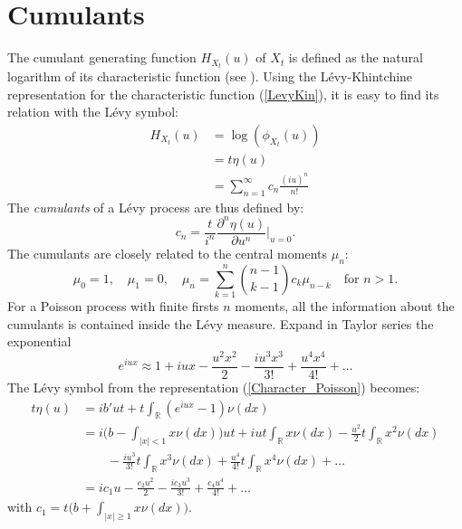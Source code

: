 \documentclass[]{interact}
\newcommand{\numberset}{\mathbb}
\newcommand{\R}{\numberset{R}}
\theoremstyle{plain}%
\theoremstyle{definition}
\theoremstyle{remark}
\begin{document}
\section{Cumulants}\label{App2}

The cumulant generating function $H_{X_t}(u)$ of $X_t$ is defined as the natural logarithm of its characteristic function
(see \cite{Cont}). 
Using the Lévy-Khintchine representation for the characteristic function (\ref{LevyKin}), it is easy to find its relation with
the Lévy symbol:
\begin{align}
H_{X_t}(u) &= \log(\phi_{X_t}(u)) \\ \nonumber
           &= t \eta(u) \\ \nonumber
           &= \sum_{n=1}^{\infty} c_n \frac{(iu)^n}{n!}
\end{align}
The \emph{cumulants} of a Lévy process are thus defined by:
\begin{equation}\label{cumulants}
 c_n = \frac{t}{i^n} \frac{\partial^n \eta(u) }{\partial u^{n}} \biggr|_{u=0} .
\end{equation}
The cumulants are closely related to the central moments $\mu_n$: 
\begin{equation}\label{moment_cumulants}
 \mu_0 = 1,\hspace{1em} \mu_1=0, \hspace{1em} \mu_n=\sum_{k=1}^n \binom{n-1}{k-1}  c_k \mu_{n-k} \hspace{1em} \mbox{for } n>1.  
\end{equation}
For a Poisson process with finite firsts $n$ moments, all the information about the cumulants is contained inside the Lévy measure.
Expand in Taylor series the exponential 
$$ e^{iux} \approx 1 +iux - \frac{u^2x^2}{2} -\frac{iu^3x^3}{3!} +\frac{u^4x^4}{4!} + \dots $$ 
The Lévy symbol from the representation (\ref{Character_Poisson}) becomes:
\begin{align}\label{cumulant_expansion}
 t \eta(u) &= ib'u t + t \int_{\R} (e^{iux} -1) \nu(dx) \\ \nonumber
          &= i\biggl( b-\int_{|x|<1} x \nu(dx) \biggr)ut +iu t\int_{\R} x \nu(dx) - \frac{u^2}{2}t\int_{\R}x^2 \nu(dx) \\ \nonumber 
          & \hspace{2em} -\frac{iu^3}{3!}t\int_{\R} x^3 \nu(dx) +\frac{u^4}{4!}t\int_{\R} x^4 \nu(dx) + \dots\\ \nonumber
	  &= ic_1 u -\frac{c_2u^2}{2} -\frac{ic_3u^3}{3!} + \frac{c_4u^4}{4!} + \dots 
\end{align}
with $c_1= t \bigl( b+\int_{|x|\geq 1} x \nu(dx) \bigr)$.






%
%
\end{document}
